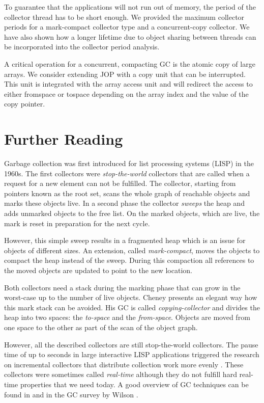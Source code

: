 To guarantee that the applications will not run out of memory, the
period of the collector thread has to be short enough. We provided
the maximum collector periods for a mark-compact collector type and a
concurrent-copy collector. We have also shown how a longer lifetime
due to object sharing between threads can be incorporated into the
collector period analysis.

A critical operation for a concurrent, compacting GC is the atomic
copy of large arrays. We consider extending JOP with a copy unit that
can be interrupted. This unit is integrated with the array access
unit and will redirect the access to either fromspace or tospace
depending on the array index and the value of the copy pointer.

\section{Further Reading}

Garbage collection was first introduced for list processing systems
(LISP) in the 1960s. The first collectors were \emph{stop-the-world}
collectors that are called when a request for a new element can not
be fulfilled. The collector, starting from pointers known as the root
set, scans the whole graph of reachable objects and marks these
objects live. In a second phase the collector \emph{sweeps} the heap
and adds unmarked objects to the free list. On the marked objects,
which are live, the mark is reset in preparation for the next cycle.

However, this simple sweep results in a fragmented heap which is an
issue for objects of different sizes. An extension, called
\emph{mark-compact}, moves the objects to compact the heap instead
of the sweep. During this compaction all references to the moved
objects are updated to point to the new location.


Both collectors need a stack during the marking phase that can grow
in the worst-case up to the number of live objects. Cheney
\cite{gc:cheney70} presents an elegant way how this mark stack can
be avoided. His GC is called \emph{copying-collector} and divides
the heap into two spaces: the \emph{to-space} and the
\emph{from-space}. Objects are moved from one space to the other as
part of the scan of the object graph.

However, all the described collectors are still stop-the-world
collectors. The pause time of up to seconds in large interactive
LISP applications triggered the research on incremental collectors
that distribute collection work more evenly \cite{gc:steele75,
gc:dijkstra78, gc:baker78}. These collectors were sometimes called
\emph{real-time} although they do not fulfill hard real-time
properties that we need today. A good overview of GC techniques can
be found in \cite{gc:jone96} and in the GC survey by Wilson
\cite{gc:wils94}.

